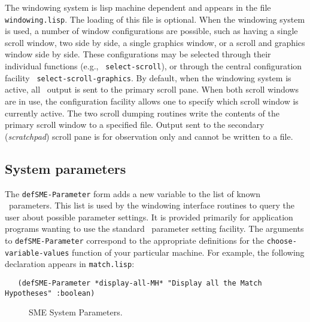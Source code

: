  The windowing system is lisp machine dependent and appears in the
file {\tt windowing.lisp}. The loading of this file is optional. When the
windowing system is used, a number of window configurations are possible,
such as having a single scroll window, two side by side, a single graphics
window, or a scroll and graphics window side by side. These configurations
may be selected through their individual functions (e.g., {\tt
select-scroll}), or through the central configuration facility {\tt
select-scroll-graphics}.  By default, when the windowing system is active,
all \SME\ output is sent to the primary scroll pane. When both scroll windows are in use, the configuration facility
allows one to specify which scroll window is currently active. The two
scroll dumping routines write the contents of the primary scroll window to a
specified file. Output sent to the secondary ({\it scratchpad}) scroll pane
is for observation only and cannot be written to a file.


\subsection{System parameters}

\indent
{}

The {\tt defSME-Parameter} form adds a new variable to the list of known
\SME\ parameters. This list is used by the windowing interface routines to
query the user about possible parameter settings. It is provided primarily
for application programs wanting to use the standard \SME\ parameter setting
facility. The arguments to {\tt defSME-Parameter} correspond to the appropriate
definitions for the {\tt choose-variable-values} function of your particular
machine. For example, the following declaration appears in {\tt match.lisp}:
\begin{small}
\begin{verbatim}
   (defSME-Parameter *display-all-MH* "Display all the Match Hypotheses" :boolean)
\end{verbatim}
\end{small}


\begin{figure}
\border
\vspace{1.2in}
\caption{SME System Parameters.}
\label{fg:parameters}
\border
\end{figure}


